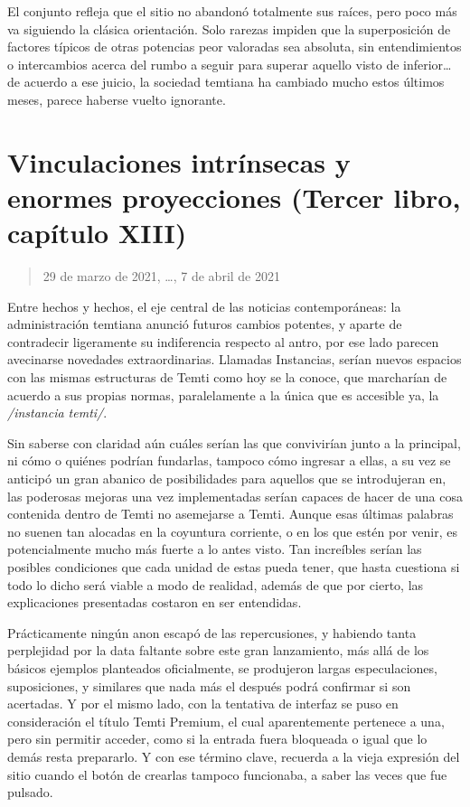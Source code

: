 \documentclass[
]{book}
\begin{document}
El conjunto refleja que el sitio no abandonó totalmente sus raíces, pero poco más va siguiendo la clásica orientación. Solo rarezas impiden que la superposición de factores típicos de otras potencias peor valoradas sea absoluta, sin entendimientos o intercambios acerca del rumbo a seguir para superar aquello visto de inferior\ldots{} de acuerdo a ese juicio, la sociedad temtiana ha cambiado mucho estos últimos meses, parece haberse vuelto ignorante.

\hypertarget{vinculaciones-intruxednsecas-y-enormes-proyecciones-tercer-libro-capuxedtulo-xiii}{%
\section{Vinculaciones intrínsecas y enormes proyecciones (Tercer libro, capítulo XIII)}\label{vinculaciones-intruxednsecas-y-enormes-proyecciones-tercer-libro-capuxedtulo-xiii}}

\begin{quote}
29 de marzo de 2021, \ldots, 7 de abril de 2021
\end{quote}

Entre hechos y hechos, el eje central de las noticias contemporáneas: la administración temtiana anunció futuros cambios potentes, y aparte de contradecir ligeramente su indiferencia respecto al antro, por ese lado parecen avecinarse novedades extraordinarias. Llamadas Instancias, serían nuevos espacios con las mismas estructuras de Temti como hoy se la conoce, que marcharían de acuerdo a sus propias normas, paralelamente a la única que es accesible ya, la \emph{/instancia temti/}.

Sin saberse con claridad aún cuáles serían las que convivirían junto a la principal, ni cómo o quiénes podrían fundarlas, tampoco cómo ingresar a ellas, a su vez se anticipó un gran abanico de posibilidades para aquellos que se introdujeran en, las poderosas mejoras una vez implementadas serían capaces de hacer de una cosa contenida dentro de Temti no asemejarse a Temti. Aunque esas últimas palabras no suenen tan alocadas en la coyuntura corriente, o en los que estén por venir, es potencialmente mucho más fuerte a lo antes visto. Tan increíbles serían las posibles condiciones que cada unidad de estas pueda tener, que hasta cuestiona si todo lo dicho será viable a modo de realidad, además de que por cierto, las explicaciones presentadas costaron en ser entendidas.

Prácticamente ningún anon escapó de las repercusiones, y habiendo tanta perplejidad por la data faltante sobre este gran lanzamiento, más allá de los básicos ejemplos planteados oficialmente, se produjeron largas especulaciones, suposiciones, y similares que nada más el después podrá confirmar si son acertadas. Y por el mismo lado, con la tentativa de interfaz se puso en consideración el título Temti Premium, el cual aparentemente pertenece a una, pero sin permitir acceder, como si la entrada fuera bloqueada o igual que lo demás resta prepararlo. Y con ese término clave, recuerda a la vieja expresión del sitio cuando el botón de crearlas tampoco funcionaba, a saber las veces que fue pulsado.
\end{document}
